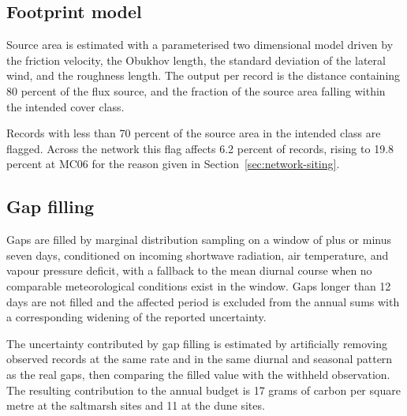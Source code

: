 \subsection{Footprint model}
\label{sec:proc-footprint}

Source area is estimated with a parameterised two dimensional model
\citep{lindholm2017footprint} driven by
the friction velocity, the Obukhov length, the standard deviation of the lateral
wind, and the roughness length. The output per record is the distance containing
80 percent of the flux source, and the fraction of the source area falling
within the intended cover class.

Records with less than 70 percent of the source area in the intended class are
flagged. Across the network this flag affects 6.2 percent of records, rising to
19.8 percent at MC06 for the reason given in Section~\ref{sec:network-siting}.

\subsection{Gap filling}
\label{sec:proc-gapfill}

Gaps are filled by marginal distribution sampling \citep{kaale2022gapfill} on a window of plus or minus
seven days, conditioned on incoming shortwave radiation, air temperature, and
vapour pressure deficit, with a fallback to the mean diurnal course when no
comparable meteorological conditions exist in the window. Gaps longer than 12
days are not filled and the affected period is excluded from the annual sums with
a corresponding widening of the reported uncertainty.

The uncertainty contributed by gap filling is estimated by artificially removing
observed records at the same rate and in the same diurnal and seasonal pattern
as the real gaps, then comparing the filled value with the withheld observation.
The resulting contribution to the annual budget is 17 grams of carbon per square
metre at the saltmarsh sites and 11 at the dune sites.
